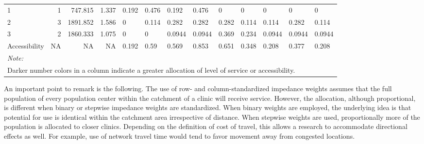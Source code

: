\documentclass[10pt,letterpaper]{article}
\begin{document}
\begin{landscape}
\begin{table}[t]
\begin{tabular}{lrrrlllllllll}
\hspace{1em}1 & 1 & 747.815 & 1.337 & \textcolor[HTML]{B32D8E}{0.192} & \textcolor[HTML]{6001A6}{0.476} & \textcolor[HTML]{F9963F}{0.192} & \textcolor[HTML]{BE3885}{0.476} & \textcolor[HTML]{FCCE25}{0} & \textcolor[HTML]{FCCE25}{0} & \textcolor[HTML]{FCCE25}{0} & \textcolor[HTML]{FCCE25}{0} & \textcolor[HTML]{FCCE25}{0}\\
\hspace{1em}2 & 3 & 1891.852 & 1.586 & \textcolor[HTML]{FCCE25}{0} & \textcolor[HTML]{F58C46}{0.114} & \textcolor[HTML]{E56A5D}{0.282} & \textcolor[HTML]{EF7C51}{0.282} & \textcolor[HTML]{CE4A75}{0.282} & \textcolor[HTML]{E26561}{0.114} & \textcolor[HTML]{E26561}{0.114} & \textcolor[HTML]{7501A8}{0.282} & \textcolor[HTML]{E26561}{0.114}\\
\hspace{1em}3 & 2 & 1860.333 & 1.075 & \textcolor[HTML]{FCCE25}{0} & \textcolor[HTML]{FCCE25}{0} & \textcolor[HTML]{FCCE25}{0.0944} & \textcolor[HTML]{FCCE25}{0.0944} & \textcolor[HTML]{AD2793}{0.369} & \textcolor[HTML]{8E0DA4}{0.234} & \textcolor[HTML]{EB7556}{0.0944} & \textcolor[HTML]{EE7B51}{0.0944} & \textcolor[HTML]{EB7556}{0.0944}\\
\hspace{1em}Accessibility & NA & NA & NA & \textcolor[HTML]{B32D8E}{0.192} & \textcolor[HTML]{0D0887}{0.59} & \textcolor[HTML]{6800A8}{0.569} & \textcolor[HTML]{0D0887}{0.853} & \textcolor[HTML]{0D0887}{0.651} & \textcolor[HTML]{0D0887}{0.348} & \textcolor[HTML]{A51F99}{0.208} & \textcolor[HTML]{0D0887}{0.377} & \textcolor[HTML]{A51F99}{0.208}\\
\bottomrule
\multicolumn{13}{l}{\textit{Note: }}\\
\multicolumn{13}{l}{Darker number colors in a column indicate a greater allocation of level of service or accessibility. }\\
\end{tabular}
\end{table}
\end{landscape}

An important point to remark is the following. The use of row- and
column-standardized impedance weights assumes that the full population
of every population center within the catchment of a clinic will receive
service. However, the allocation, although proportional, is different
when binary or stepwise impedance weights are standardized. When binary
weights are employed, the underlying idea is that potential for use is
identical within the catchment area irrespective of distance. When
stepwise weights are used, proportionally more of the population is
allocated to closer clinics. Depending on the definition of cost of
travel, this allows a research to accommodate directional effects as
well. For example, use of network travel time would tend to favor
movement away from congested locations.
\end{document}
